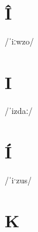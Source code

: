 \documentclass[10pt,a4paper,twoside]{book}
\begin{document}
\section*{Î}

\begin{multicols}{3}
 {/ˈiːwzo/} {}
\end{multicols}

\section*{I}

\begin{multicols}{3}
 {/ˈizdaː/} {}
\end{multicols}

\section*{Í}

\begin{multicols}{3}
 {/ˈiˑzus/} {}
\end{multicols}

\section*{K}
\end{document}
